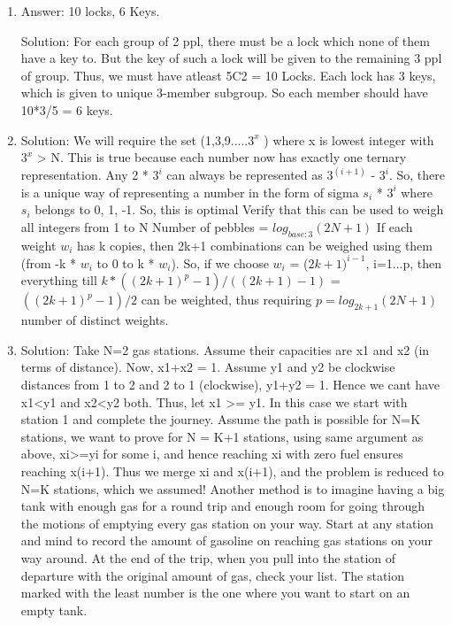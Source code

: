 \begin{enumerate}

\item
Answer: 10 locks, 6 Keys.
 
Solution: For each group of 2 ppl, there must be a lock which none of them have a key to. But the key of such a lock will be given to the remaining 3 ppl of group. Thus, we must have atleast 5C2 = 10 Locks. Each lock has 3 keys, which is given to unique 3-member subgroup. So each member should have 10*3/5 = 6 keys.




\item
Solution: We will require the set (1,3,9.....$3^x$ )
where x is lowest integer with $3^x$ > N. This is true because each number now has exactly one ternary representation. Any 2 * $3^i$ can always be represented as $3^(i+1)$ - $3^i$. So, there is a unique way of representing a number in the form of sigma $s_i$ * $3^i$ where $s_i$ belongs to {0, 1, -1}. So, this is optimal
Verify that this can be used to weigh all integers from 1 to N
Number of pebbles = $log_{base:3} (2N+1)$
If each weight $w_i$ has k copies, then 2k+1 combinations can be weighed using them (from -k * $w_i$ to 0 to k * $w_i$). So, if we choose $w_i$ = ($2k+1)^{i-1}$, i=1...p, then everything till $k*((2k+1)^p - 1)/((2k+1)-1)$ = $((2k+1)^p-1)/2$ can be weighted, thus requiring $p=log_{2k+1} (2N+1)$ number of distinct weights.




\item
Solution: Take N=2 gas stations. Assume their capacities are x1 and x2 (in terms of distance). Now, x1+x2 = 1. Assume y1 and y2 be clockwise distances from 1 to 2 and 2 to 1 (clockwise), y1+y2 = 1. Hence we cant have x1<y1 and x2<y2 both. Thus, let x1 >= y1. In this case we start with station 1 and complete the journey. Assume the path is possible for N=K stations, we want to prove for N = K+1 stations, using same argument as above, xi>=yi for some i, and hence reaching xi with zero fuel ensures reaching x(i+1). Thus we merge xi and x(i+1), and the problem is reduced to N=K stations, which we assumed!
Another method is to imagine having a big tank with enough gas for a round trip and enough room for going through the motions of emptying every gas station on your way. Start at any station and mind to record the amount of gasoline on reaching gas stations on your way around. At the end of the trip, when you pull into the station of departure with the original amount of gas, check your list. The station marked with the least number is the one where you want to start on an empty tank.




\end{enumerate}
